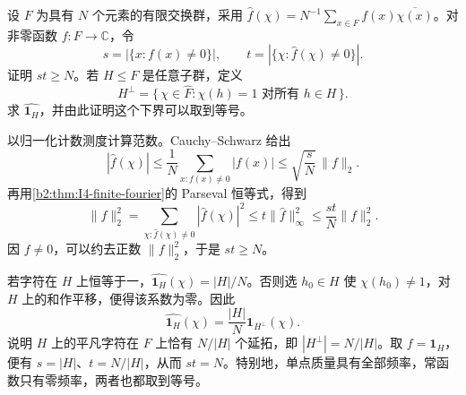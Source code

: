 \begin{exercise}[有限群的不确定性估计]\label{b2:ex:I4-finite-uncertainty}
设 \(F\) 为具有 \(N\) 个元素的有限交换群，采用
\(\widehat f(\chi)=N^{-1}\sum_{x\in F}f(x)\overline{\chi(x)}\)。对非零函数 \(f:F\rightarrow\mathbb C\)，令
\[
 s=|\{x:f(x)\ne0\}|,\qquad
 t=|\{\chi:\widehat f(\chi)\ne0\}|.
\]
证明 \(st\ge N\)。若 \(H\le F\) 是任意子群，定义
\[
 H^\perp=\{\,\chi\in\widehat F:\chi(h)=1\text{ 对所有 }h\in H\,\}.
\]
求 \(\widehat{\mathbf1_H}\)，并由此证明这个下界可以取到等号。
\end{exercise}
\begin{solution}
以归一化计数测度计算范数。Cauchy--Schwarz 给出
\[
 |\widehat f(\chi)|
 \le\frac1N\sum_{x:f(x)\ne0}|f(x)|
 \le\sqrt{\frac sN}\,\|f\|_2.
\]
再用\cref{b2:thm:I4-finite-fourier}的 Parseval 恒等式，得到
\[
 \|f\|_2^2
 =\sum_{\chi:\widehat f(\chi)\ne0}|\widehat f(\chi)|^2
 \le t\|\widehat f\|_\infty^2
 \le\frac{st}{N}\|f\|_2^2.
\]
因 \(f\ne0\)，可以约去正数 \(\|f\|_2^2\)，于是 \(st\ge N\)。

若字符在 \(H\) 上恒等于一，\(\widehat{\mathbf1_H}(\chi)=|H|/N\)。否则选 \(h_0\in H\) 使 \(\chi(h_0)\ne1\)，对 \(H\) 上的和作平移，便得该系数为零。因此
\[
 \widehat{\mathbf1_H}(\chi)=\frac{|H|}{N}\mathbf1_{H^\perp}(\chi).
\]
说明 \(H\) 上的平凡字符在 \(F\) 上恰有 \(N/|H|\) 个延拓，即 \(|H^\perp|=N/|H|\)。取 \(f=\mathbf1_H\)，便有 \(s=|H|\)、\(t=N/|H|\)，从而 \(st=N\)。特别地，单点质量具有全部频率，常函数只有零频率，两者也都取到等号。
\end{solution}

